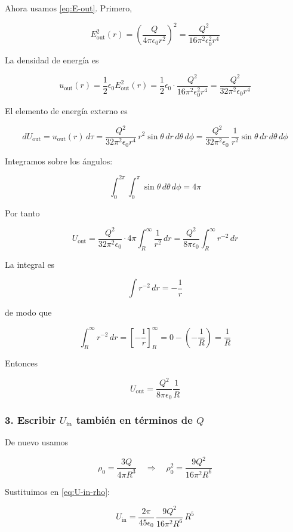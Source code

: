 \documentclass{article}
\begin{document}
Ahora usamos \eqref{eq:E-out}. Primero,

\[
E_{\text{out}}^{2}(r) =
\left(\frac{Q}{4\pi\epsilon_{0}r^{2}}\right)^{2}
= \frac{Q^{2}}{16\pi^{2}\epsilon_{0}^{2}r^{4}}
\]

La densidad de energía es

\[
u_{\text{out}}(r) =
\frac{1}{2}\epsilon_{0}E_{\text{out}}^{2}(r)
= \frac{1}{2}\epsilon_{0}
  \cdot \frac{Q^{2}}{16\pi^{2}\epsilon_{0}^{2}r^{4}}
= \frac{Q^{2}}{32\pi^{2}\epsilon_{0}r^{4}}
\]

El elemento de energía externo es

\[
dU_{\text{out}} = u_{\text{out}}(r)\,d\tau
= \frac{Q^{2}}{32\pi^{2}\epsilon_{0}r^{4}}\,
  r^{2}\sin\theta\,dr\,d\theta\,d\phi
= \frac{Q^{2}}{32\pi^{2}\epsilon_{0}}\,
  \frac{1}{r^{2}}\sin\theta\,dr\,d\theta\,d\phi
\]

Integramos sobre los ángulos:

\[
\int_{0}^{2\pi}\!\!\int_{0}^{\pi}\sin\theta\,d\theta\,d\phi = 4\pi
\]

Por tanto

\[
U_{\text{out}}
= \frac{Q^{2}}{32\pi^{2}\epsilon_{0}} \cdot 4\pi
  \int_{R}^{\infty} \frac{1}{r^{2}}\,dr
= \frac{Q^{2}}{8\pi\epsilon_{0}}
  \int_{R}^{\infty} r^{-2}\,dr
\]

La integral es

\[
\int r^{-2}\,dr = -\frac{1}{r}
\]

de modo que

\[
\int_{R}^{\infty} r^{-2}\,dr
= \left[-\frac{1}{r}\right]_{R}^{\infty}
= 0 - \left(-\frac{1}{R}\right)
= \frac{1}{R}
\]

Entonces

\begin{equation}
U_{\text{out}} = \frac{Q^{2}}{8\pi\epsilon_{0}}\frac{1}{R}
\label{eq:U-out-Q}
\end{equation}

\subsubsection*{3. Escribir $U_{\text{in}}$ también en términos de $Q$}

De nuevo usamos

\[
\rho_{0} = \frac{3Q}{4\pi R^{3}}
\quad\Longrightarrow\quad
\rho_{0}^{2} = \frac{9Q^{2}}{16\pi^{2}R^{6}}
\]

Sustituimos en \eqref{eq:U-in-rho}:

\[
U_{\text{in}} = \frac{2\pi}{45\epsilon_{0}}\,
                \frac{9Q^{2}}{16\pi^{2}R^{6}}\,
                R^{5}
\]
\end{document}

